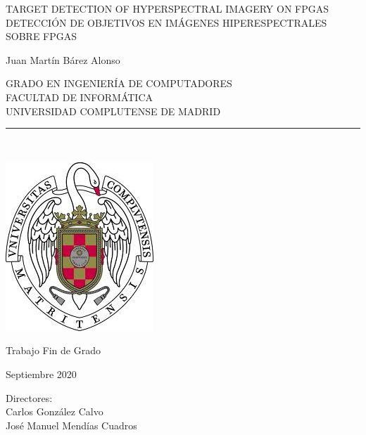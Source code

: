\begin{center}

   \vspace{1cm}


   {\Large TARGET DETECTION OF HYPERSPECTRAL IMAGERY ON FPGAS}\\
   \vspace{0.5cm}
   {\Large DETECCIÓN DE OBJETIVOS EN IMÁGENES HIPERESPECTRALES SOBRE FPGAS}\\

   \vspace{0.5cm}

   \vspace{0.5cm}


   {\large Juan Martín Bárez Alonso}\\

   \vspace{0.5cm}


   GRADO EN INGENIERÍA DE COMPUTADORES\\
   FACULTAD DE INFORMÁTICA\\
   UNIVERSIDAD COMPLUTENSE DE MADRID \\


   \vspace{0.65cm}
   \rule{2in}{0.5pt}\\
   \vspace{0.85cm}

  \includegraphics[height=2.5in]{figures/escudo.jpg}
  

   \vspace{0.5cm}
Trabajo Fin de Grado

   \vspace{0.5cm}



  Septiembre 2020\\
   \vspace{1cm}

\end{center}

{\raggedleft
Directores:\\
   \vspace{ 1cm}
Carlos González Calvo\\
José Manuel Mendías Cuadros\\
}